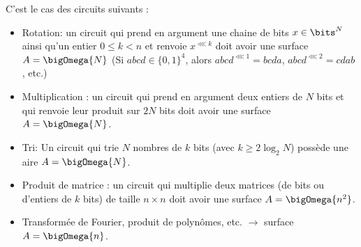 C'est le cas des circuits suivants :
\begin{itemize}
\item Rotation: un circuit qui prend en argument une chaine de bits
  $x \in \bits^N$ ainsi qu'un entier $0 \leq k < n$ et renvoie $x^{\lll k}$ doit
  avoir une surface $A = \bigOmega{N}$ (Si $abcd \in \{0, 1\}^4$, alors
  $abcd^{\lll 1} = bcda$, $abcd^{\lll 2} = cdab$, etc.)

\item Multiplication : un circuit qui prend en argument deux entiers de $N$ bits
  et qui renvoie leur produit sur $2N$ bits doit avoir une surface
  $A = \bigOmega{N}$.

\item Tri: Un circuit qui trie $N$ nombres de $k$ bits (avec
  $k \geq 2 \log_2 N$) possède une aire $A = \bigOmega{N}$.

\item Produit de matrice : un circuit qui multiplie deux matrices (de bits ou
  d'entiers de $k$ bits) de taille $n \times n$ doit avoir une surface $A = \bigOmega{n^2}$.

\item Transformée de Fourier, produit de polynômes, etc. $\to$ surface $A = \bigOmega{n}$.
\end{itemize}


